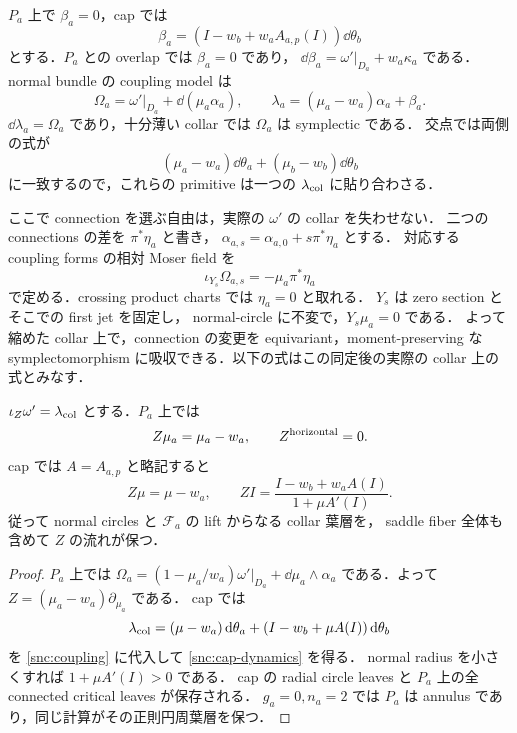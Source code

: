 $P_a$ 上で $\beta_a=0$，cap では
\[
 \beta_a=(I-w_b+w_aA_{a,p}(I))\dd\theta_b
\]
とする．$P_a$ との overlap では $\beta_a=0$ であり，
$\dd\beta_a=\omega'|_{D_a}+w_a\kappa_a$ である．
normal bundle の coupling model は
\begin{equation}\label{snc:coupling}
 \Omega_a=\omega'|_{D_a}+\dd(\mu_a\alpha_a),\qquad
 \lambda_a=(\mu_a-w_a)\alpha_a+\beta_a.
\end{equation}
$\dd\lambda_a=\Omega_a$ であり，十分薄い collar では $\Omega_a$ は symplectic である．
交点では両側の式が
\[
 (\mu_a-w_a)\dd\theta_a+(\mu_b-w_b)\dd\theta_b
\]
に一致するので，これらの primitive は一つの
$\lambda_{\rm col}$ に貼り合わさる．

ここで connection を選ぶ自由は，実際の $\omega'$ の collar を失わせない．
二つの connections の差を $\pi^*\eta_a$ と書き，
$\alpha_{a,s}=\alpha_{a,0}+s\pi^*\eta_a$ とする．
対応する coupling forms の相対 Moser field を
\[
 \iota_{Y_s}\Omega_{a,s}=-\mu_a\pi^*\eta_a
\]
で定める．crossing product charts では $\eta_a=0$ と取れる．
$Y_s$ は zero section とそこでの first jet を固定し，
normal-circle に不変で，$Y_s\mu_a=0$ である．
よって縮めた collar 上で，connection の変更を equivariant，moment-preserving な
symplectomorphism に吸収できる．以下の式はこの同定後の実際の collar 上の式とみなす．

\begin{lemma}
\label{snc:collar-dynamics}
$\iota_Z\omega'=\lambda_{\rm col}$ とする．$P_a$ 上では
\[
 Z\mu_a=\mu_a-w_a,\qquad Z^{\rm horizontal}=0.
\]
cap では $A=A_{a,p}$ と略記すると
\begin{equation}\label{snc:cap-dynamics}
 Z\mu=\mu-w_a,\qquad
 ZI=\frac{I-w_b+w_aA(I)}{1+\mu A'(I)}.
\end{equation}
従って normal circles と $\mathcal F_a$ の lift からなる collar 葉層を，
saddle fiber 全体も含めて $Z$ の流れが保つ．
\end{lemma}
\begin{proof}
$P_a$ 上では
$\Omega_a=(1-\mu_a/w_a)\omega'|_{D_a}+\dd\mu_a\wedge\alpha_a$
である．よって $Z=(\mu_a-w_a)\partial_{\mu_a}$ である．
cap では
\[
 \lambda_{\rm col}=(\mu-w_a)\,\mathrm d\theta_a+
     (I-w_b+\mu A(I))\,\mathrm d\theta_b
\]
を \eqref{snc:coupling} に代入して \eqref{snc:cap-dynamics} を得る．
normal radius を小さくすれば $1+\mu A'(I)>0$ である．
cap の radial circle leaves と $P_a$ 上の全 connected critical leaves が保存される．
$g_a=0,n_a=2$ では $P_a$ は annulus であり，同じ計算がその正則円周葉層を保つ．
\end{proof}

